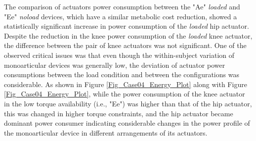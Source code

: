 \documentclass[10pt,letterpaper]{article}
\begin{document}
The comparison of actuators power consumption between the "Ae" {\it loaded} and "Ee" {\it noload} devices, which have a similar metabolic cost reduction, showed a statistically significant increase in power consumption of the {\it loaded} hip actuator. Despite the reduction in the knee power consumption of the {\it loaded} knee actuator, the difference between the pair of knee actuators was not significant. One of the observed critical issues was that even though the within-subject variation of monoarticular devices was generally low, the deviation of actuator power consumptions between the load condition and between the configurations was considerable. As shown in Figure \ref{Fig_Case04_Energy_Plot} along with Figure \ref{Fig_Case04_Energy_Plot}, while the power consumption of the knee actuator in the low torque availability (i.e., "Ee") was higher than that of the hip actuator, this was changed in higher torque constraints, and the hip actuator became dominant power consumer indicating considerable changes in the power profile of the monoarticular device in different arrangements of its actuators.\\
\end{document}
